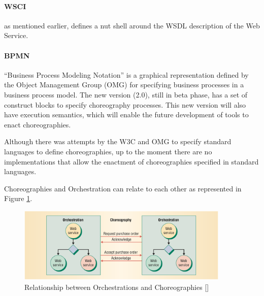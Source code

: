 \paragraph{WSCI}
as mentioned earlier, defines a nut shell around the WSDL description of the Web Service.

\paragraph{BPMN}
``Business Process Modeling Notation'' is a graphical representation defined by the Object Management Group (OMG) for specifying business processes in a business process model. The new version (2.0), still in beta phase, has a set of construct blocks to specify choreography processes. This new version will also have execution semantics, which will enable the future development of tools to enact choreographies.

Although there was attempts by the W3C and OMG to specify standard languages to define choreographies, up to the moment there are no implementations that allow the enactment of choreographies specified in standard languages.

Choreographies and Orchestration can relate to each other as represented in Figure \ref{relation-orchestrationXchoreography}.


\begin{figure}[htb]
	\centering
	\includegraphics[width=0.9\textwidth]{images/relation-orchestrationXchoreography}
	\caption{Relationship between Orchestrations and Choreographies [\citet{WSOC}]}
	\label{relation-orchestrationXchoreography}
\end{figure}




